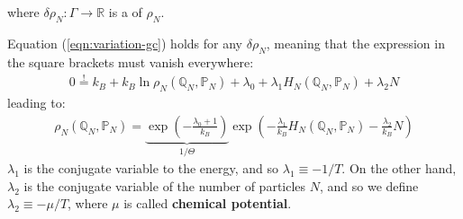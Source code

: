 \documentclass[../../main.tex]{subfiles}
\begin{document}
where $\delta \rho_N \colon \Gamma \to \mathbb{R}$ is a  of $\rho_N$. 

\medskip

Equation (\ref{eqn:variation-gc}) holds for any $\delta \rho_N$, meaning that the expression in the square brackets must vanish everywhere:
\begin{align*}
    0 \overset{!}{=} k_B + k_B \ln \rho_N(\mathbb{Q}_N, \mathbb{P}_N) + \lambda_0 + \lambda_1 H_N(\mathbb{Q}_N, \mathbb{P}_N) + \lambda_2 N
\end{align*}
leading to:
\begin{align*}
    \rho_N(\mathbb{Q}_N, \mathbb{P}_N) = \underbrace{\exp\left(-\frac{\lambda_0 + 1}{k_B} \right) }_{1/\Theta}\exp\left(-\frac{\lambda_1}{k_B} H_N(\mathbb{Q}_N, \mathbb{P}_N) - \frac{\lambda_2}{k_B} N  \right)
\end{align*}
$\lambda_1$ is the conjugate variable to the energy, and so $\lambda_1 \equiv -1/T$. On the other hand, $\lambda_2$ is the conjugate variable of the number of particles $N$, and so we define $\lambda_2 \equiv -\mu/T$, where $\mu$ is called \textbf{chemical potential}. %
\end{document}
